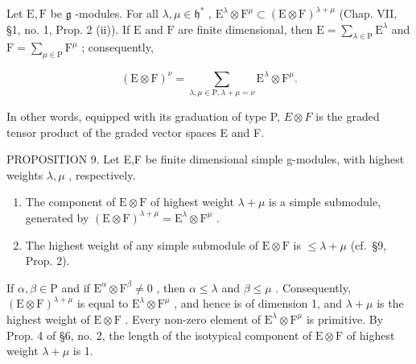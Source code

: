 Let \(\mathrm{E},\mathrm{F}\) be \(\mathfrak{g}\) -modules. For all \(\lambda, \mu \in \mathfrak{h}^*\) , \(\mathrm{E}^\lambda \otimes \mathrm{F}^\mu \subset (\mathrm{E} \otimes \mathrm{F})^{\lambda + \mu}\) (Chap. VII, §1, no. 1, Prop. 2 (ii)). If \(\mathrm{E}\) and \(\mathrm{F}\) are finite dimensional, then \(\mathrm{E} = \sum_{\lambda \in \mathrm{P}} \mathrm{E}^\lambda\) and \(\mathrm{F} = \sum_{\mu \in \mathrm{P}} \mathrm{F}^\mu\) ; consequently,

\[
(\mathrm{E} \otimes \mathrm{F}) ^ {\nu} = \sum_ {\lambda , \mu \in \mathrm{P}, \lambda + \mu = \nu} \mathrm{E} ^ {\lambda} \otimes \mathrm{F} ^ {\mu}.
\]

In other words, equipped with its graduation of type P, \(E \otimes F\) is the graded tensor product of the graded vector spaces E and F.

PROPOSITION 9. Let E,F be finite dimensional simple g-modules, with highest weights \(\lambda,\mu\) , respectively.

\begin{enumerate}
\def\labelenumi{(\roman{enumi})}
\item
  The component of \(\mathrm{E} \otimes \mathrm{F}\) of highest weight \(\lambda + \mu\) is a simple submodule, generated by \((\mathrm{E} \otimes \mathrm{F})^{\lambda + \mu} = \mathrm{E}^{\lambda} \otimes \mathrm{F}^{\mu}\) .
\item
  The highest weight of any simple submodule of \(\mathrm{E} \otimes \mathrm{F}\) is \(\leq \lambda + \mu\) (cf.~§9, Prop. 2).
\end{enumerate}

If \(\alpha, \beta \in \mathrm{P}\) and if \(\mathrm{E}^{\alpha} \otimes \mathrm{F}^{\beta} \neq 0\) , then \(\alpha \leq \lambda\) and \(\beta \leq \mu\) . Consequently, \((\mathrm{E} \otimes \mathrm{F})^{\lambda + \mu}\) is equal to \(\mathrm{E}^{\lambda} \otimes \mathrm{F}^{\mu}\) , and hence is of dimension 1, and \(\lambda + \mu\) is the highest weight of \(\mathrm{E} \otimes \mathrm{F}\) . Every non-zero element of \(\mathrm{E}^{\lambda} \otimes \mathrm{F}^{\mu}\) is primitive. By Prop. 4 of §6, no. 2, the length of the isotypical component of \(\mathrm{E} \otimes \mathrm{F}\) of highest weight \(\lambda + \mu\) is 1.

